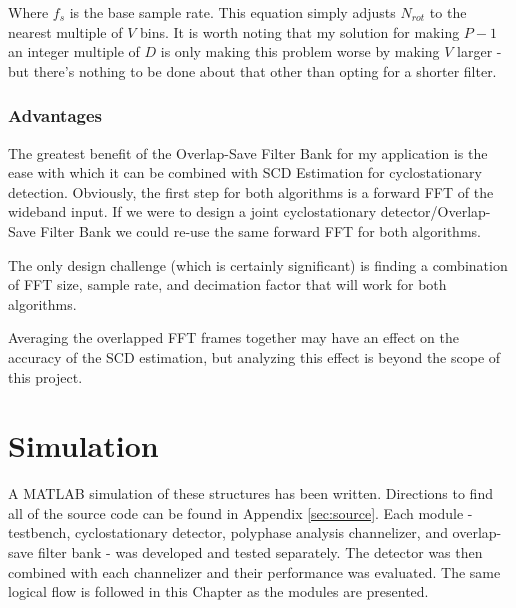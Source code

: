 \documentclass[12pt]{report}
\begin{document}
Where $f_s$ is the base sample rate. This equation simply adjusts $N_{rot}$ to
the nearest multiple of $V$ bins. It is worth noting that my solution for
making $P-1$ an integer multiple of $D$ is only making this problem worse by
making $V$ larger - but there's nothing to be done about that other than opting
for a shorter filter.

\subsection{Advantages}
\label{sec:os_advantages}

The greatest benefit of the Overlap-Save Filter Bank for my application is
the ease with which it can be combined with SCD Estimation for cyclostationary
detection. Obviously, the first step for both algorithms is a forward FFT of the
wideband input. If we were to design a joint cyclostationary
detector/Overlap-Save Filter Bank we could re-use the same forward FFT for both
algorithms.

The only design challenge (which is certainly significant) is finding
a combination of FFT size, sample rate, and decimation factor that will work
for both algorithms.



Averaging the overlapped FFT frames together may have an effect on the accuracy
of the SCD estimation, but analyzing this effect is beyond the scope of this
project.

\chapter{Simulation}
\label{sec:sim}
A MATLAB simulation of these structures has been written. Directions to find
all of the source code can be found in Appendix \ref{sec:source}. Each module
- testbench, cyclostationary detector, polyphase analysis channelizer, and
overlap-save filter bank - was developed and tested separately. The detector
was then combined with each channelizer and their performance was evaluated.
The same logical flow is followed in this Chapter as the modules are presented.
\end{document}
